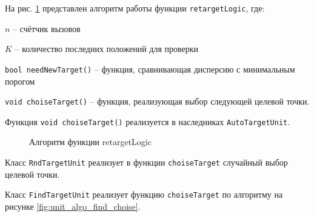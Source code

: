 \label{ref:unit_algo_retarget}

На рис. \ref{fig:unit_algo_retarget} представлен алгоритм работы
функции \verb|retargetLogic|, где:

$n$ -- счётчик вызовов

$K$ -- количество последних положений для проверки

\verb|bool needNewTarget()| -- функция, сравнивающая дисперсию с минимальным порогом

\verb|void choiseTarget()| -- функция, реализующая выбор следующей целевой точки.

Функция \verb|void choiseTarget()| реализуется в наследниках \verb|AutoTargetUnit|.

\begin{figure}[h!]

    \centering


    \caption{Алгоритм функции retargetLogic}
    \label{fig:unit_algo_retarget}
\end{figure}

Класс \verb|RndTargetUnit| реализует в функции \verb|choiseTarget| случайный
выбор целевой точки.

Класс \verb|FindTargetUnit| реализует функцию \verb|choiseTarget| по алгоритму на
рисунке \ref{fig:unit_algo_find_choise}.
\label{ref:algo:choise:find}


